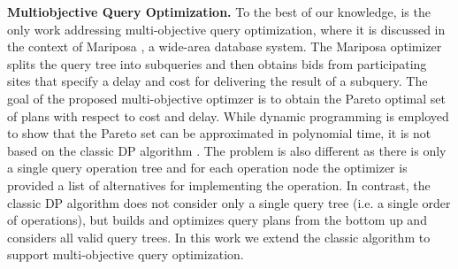 \textbf{Multiobjective Query Optimization.} To the best of our
knowledge, \cite{papadimitriou_multiobjective_2001} is the only work
addressing multi-objective query optimization, where it is discussed
in the context of Mariposa \cite{stonebraker_mariposa:_1996}, a
wide-area database system. The Mariposa optimizer splits the query
tree into subqueries and then obtains bids from participating sites
that specify a delay and cost for delivering the result of a
subquery. The goal of the proposed multi-objective optimzer
\cite{papadimitriou_multiobjective_2001} is to obtain the Pareto
optimal set of plans with respect to cost and delay. While dynamic
programming is employed to show that the Pareto set can be
approximated in polynomial time, it is not based on the classic DP
algorithm \cite{selinger_access_1979}. The problem is also different
as there is only a single query operation tree and for each operation
node the optimizer is provided a list of alternatives for implementing
the operation. In contrast, the classic DP algorithm does not consider
only a single query tree (i.e. a single order of operations), but
builds and optimizes query plans from the bottom up and considers all
valid query trees. In this work we extend the classic algorithm to
support multi-objective query optimization.












